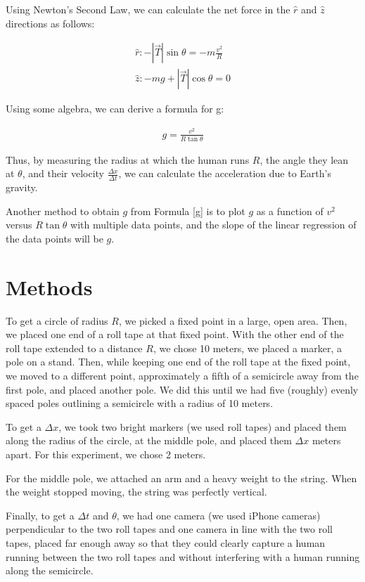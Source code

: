\documentclass[12pt]{article}
\begin{document}
Using Newton's Second Law, we can calculate the net force in the \(\hat{r}\) and \(\hat{z}\) directions as follows:

\begin{align}
\hat{r}: -|\vec{T}|\sin\theta = -m \frac{v^2}{R} \\
\hat{z}: -mg + |\vec{T}|\cos\theta = 0
\end{align}

Using some algebra, we can derive a formula for g:

\begin{align} \label{g}
g = \frac{v^2}{R\tan\theta}
\end{align}

Thus, by measuring the radius at which the human runs \(R\), the angle they lean at \(\theta\), and their velocity \(\frac{\Delta x}{\Delta t}\), we can calculate the acceleration due to Earth's gravity.

Another method to obtain \(g\) from Formula \ref{g} is to plot \(g\) as a function of \(v^2\) versus \(R\tan\theta\) with multiple data points, and the slope of the linear regression of the data points will be \(g\).
\section{Methods}
\label{sec:orgf936aa9}

To get a circle of radius \(R\), we picked a fixed point in a large, open area. Then, we placed one end of a roll tape at that fixed point. With the other end of the roll tape extended to a distance \(R\), we chose 10 meters, we placed a marker, a pole on a stand. Then, while keeping one end of the roll tape at the fixed point, we moved to a different point, approximately a fifth of a semicircle away from the first pole, and placed another pole. We did this until we had five (roughly) evenly spaced poles outlining a semicircle with a radius of 10 meters.

To get a \(\Delta x\), we took two bright markers (we used roll tapes) and placed them along the radius of the circle, at the middle pole, and placed them \(\Delta x\) meters apart. For this experiment, we chose 2 meters.

For the middle pole, we attached an arm and a heavy weight to the string. When the weight stopped moving, the string was perfectly vertical.

Finally, to get a \(\Delta t\) and \(\theta\), we had one camera (we used iPhone cameras) perpendicular to the two roll tapes and one camera in line with the two roll tapes, placed far enough away so that they could clearly capture a human running between the two roll tapes and without interfering with a human running along the semicircle.
\end{document}
